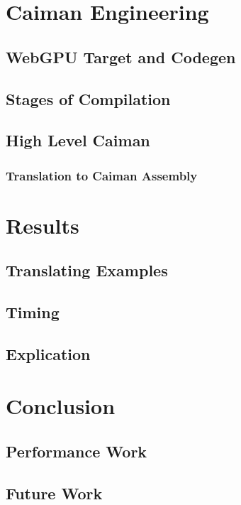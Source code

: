 \section{Caiman Engineering}

\subsection{WebGPU Target and Codegen}

\subsection{Stages of Compilation}

\subsection{High Level Caiman}

\subsubsection{Translation to Caiman Assembly}

\section{Results}

\subsection{Translating Examples}

\subsection{Timing}

\subsection{Explication}

\section{Conclusion}

\subsection{Performance Work}

\subsection{Future Work}
